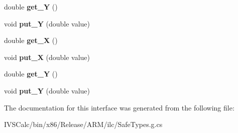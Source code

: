 \begin{DoxyCompactItemize}
\item 
\mbox{\label{interface_windows_1_1_u_i_1_1_xaml_1_1_media_1_1_i_translate_transform_abe5ed0af613e25734413e2c0dec03333}} 
double {\bfseries get\+\_\+Y} ()
\item 
\mbox{\label{interface_windows_1_1_u_i_1_1_xaml_1_1_media_1_1_i_translate_transform_a180ffc4b24774d39be33f54f787239be}} 
void {\bfseries put\+\_\+Y} (double value)
\item 
\mbox{\label{interface_windows_1_1_u_i_1_1_xaml_1_1_media_1_1_i_translate_transform_ad50558830dd38b2c9737f34ed46d2fb5}} 
double {\bfseries get\+\_\+X} ()
\item 
\mbox{\label{interface_windows_1_1_u_i_1_1_xaml_1_1_media_1_1_i_translate_transform_a100906e975e93817a3fc61f890a7198d}} 
void {\bfseries put\+\_\+X} (double value)
\item 
\mbox{\label{interface_windows_1_1_u_i_1_1_xaml_1_1_media_1_1_i_translate_transform_abe5ed0af613e25734413e2c0dec03333}} 
double {\bfseries get\+\_\+Y} ()
\item 
\mbox{\label{interface_windows_1_1_u_i_1_1_xaml_1_1_media_1_1_i_translate_transform_a180ffc4b24774d39be33f54f787239be}} 
void {\bfseries put\+\_\+Y} (double value)
\end{DoxyCompactItemize}


The documentation for this interface was generated from the following file\+:\begin{DoxyCompactItemize}
\item 
I\+V\+S\+Calc/bin/x86/\+Release/\+A\+R\+M/ilc/Safe\+Types.\+g.\+cs\end{DoxyCompactItemize}
